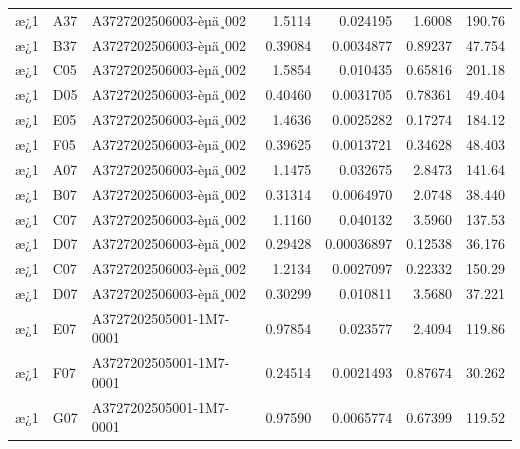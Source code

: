 \documentclass[UTF8,10pt,a4paper,fontset=fandol]{ctexart}
\begin{document}
\begin{tabularx}{\textwidth}{@{}llXrrrr@{}}
\small
æ¿1 & A37 & A3727202506003-\newline èµä¸002 & 1.5114 & 0.024195 & 1.6008 & 190.76 \\
æ¿1 & B37 & A3727202506003-\newline èµä¸002 & 0.39084 & 0.0034877 & 0.89237 & 47.754 \\
æ¿1 & C05 & A3727202506003-\newline èµä¸002 & 1.5854 & 0.010435 & 0.65816 & 201.18 \\
æ¿1 & D05 & A3727202506003-\newline èµä¸002 & 0.40460 & 0.0031705 & 0.78361 & 49.404 \\
æ¿1 & E05 & A3727202506003-\newline èµä¸002 & 1.4636 & 0.0025282 & 0.17274 & 184.12 \\
æ¿1 & F05 & A3727202506003-\newline èµä¸002 & 0.39625 & 0.0013721 & 0.34628 & 48.403 \\
æ¿1 & A07 & A3727202506003-\newline èµä¸002 & 1.1475 & 0.032675 & 2.8473 & 141.64 \\
æ¿1 & B07 & A3727202506003-\newline èµä¸002 & 0.31314 & 0.0064970 & 2.0748 & 38.440 \\
æ¿1 & C07 & A3727202506003-\newline èµä¸002 & 1.1160 & 0.040132 & 3.5960 & 137.53 \\
æ¿1 & D07 & A3727202506003-\newline èµä¸002 & 0.29428 & 0.00036897 & 0.12538 & 36.176 \\
æ¿1 & C07 & A3727202506003-\newline èµä¸002 & 1.2134 & 0.0027097 & 0.22332 & 150.29 \\
æ¿1 & D07 & A3727202506003-\newline èµä¸002 & 0.30299 & 0.010811 & 3.5680 & 37.221 \\
æ¿1 & E07 & A3727202505001-\newline 1M7-0001 & 0.97854 & 0.023577 & 2.4094 & 119.86 \\
æ¿1 & F07 & A3727202505001-\newline 1M7-0001 & 0.24514 & 0.0021493 & 0.87674 & 30.262 \\
æ¿1 & G07 & A3727202505001-\newline 1M7-0001 & 0.97590 & 0.0065774 & 0.67399 & 119.52 \\

\end{tabularx}
\end{document}
